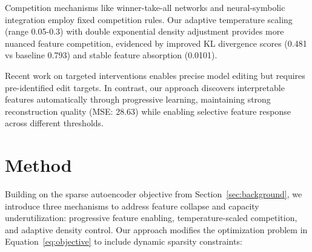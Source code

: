 \documentclass{article} %
\begin{document}
Competition mechanisms like winner-take-all networks \cite{Maass2000OnTC} and neural-symbolic integration \cite{Hitzler2020NeuralsymbolicIA} employ fixed competition rules. Our adaptive temperature scaling (range 0.05-0.3) with double exponential density adjustment provides more nuanced feature competition, evidenced by improved KL divergence scores (0.481 vs baseline 0.793) and stable feature absorption (0.0101).

Recent work on targeted interventions \cite{Meng2022LocatingAE} enables precise model editing but requires pre-identified edit targets. In contrast, our approach discovers interpretable features automatically through progressive learning, maintaining strong reconstruction quality (MSE: 28.63) while enabling selective feature response across different thresholds.

% 
%
%
%
%
%


\section{Method}
\label{sec:method}

Building on the sparse autoencoder objective from Section~\ref{sec:background}, we introduce three mechanisms to address feature collapse and capacity underutilization: progressive feature enabling, temperature-scaled competition, and adaptive density control. Our approach modifies the optimization problem in Equation~\ref{eq:objective} to include dynamic sparsity constraints:
\end{document}
